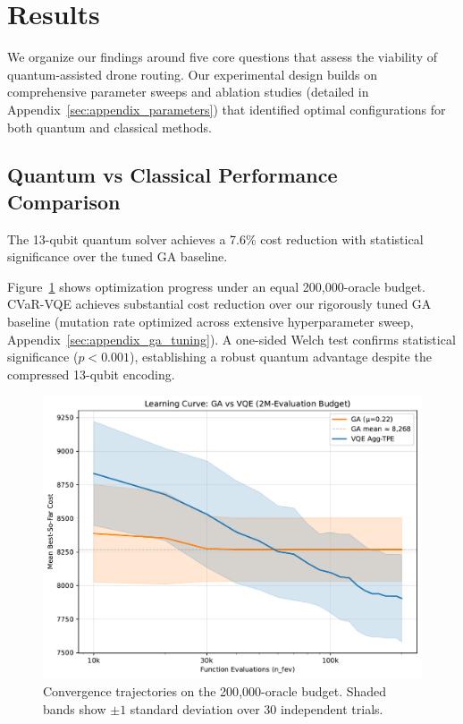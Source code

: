 \section{Results}
\label{sec:results}

We organize our findings around five core questions that assess the viability 
of quantum-assisted drone routing. Our experimental design builds on comprehensive 
parameter sweeps and ablation studies (detailed in Appendix~\ref{sec:appendix_parameters}) 
that identified optimal configurations for both quantum and classical methods.

\subsection{Quantum vs Classical Performance Comparison}

The 13-qubit quantum solver achieves a 7.6\% cost reduction with statistical 
significance over the tuned GA baseline.

Figure~\ref{fig:learning_curves} shows optimization progress under an equal
200{,}000-oracle budget. CVaR-VQE achieves substantial cost reduction over 
our rigorously tuned GA baseline (mutation rate optimized across extensive 
hyperparameter sweep, Appendix~\ref{sec:appendix_ga_tuning}). A one-sided Welch test confirms statistical significance 
($p<0.001$), establishing a robust quantum advantage despite the compressed 
13-qubit encoding.

\begin{figure}[h]
  \centering
  \includegraphics[width=.7\linewidth]{fig/learning_curves_comparison.pdf}
  \caption{Convergence trajectories on the 200{,}000-oracle budget. 
           Shaded bands show $\pm1$ standard deviation over 30 independent trials.}
  \label{fig:learning_curves}
\end{figure}

